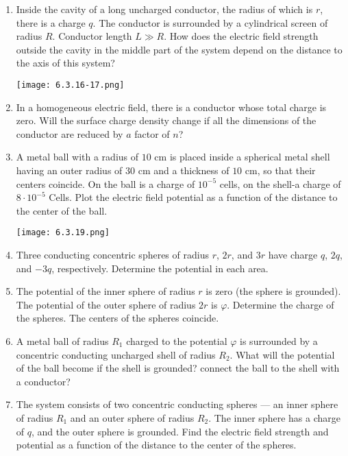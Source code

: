 \documentclass{article}
\begin{document}
\begin{enumerate}[label=6.3.\arabic*]
\item Inside the cavity of a long uncharged conductor, the radius of which is $r$, there is a charge $q$. The conductor is surrounded by a cylindrical screen of radius $R$. Conductor length $L \gg R$. How does the electric field strength outside the cavity in the middle part of the system depend on the distance to the axis of this system?

\begin{center}
    \texttt{[image: 6.3.16-17.png]}
\end{center}

\item In a homogeneous electric field, there is a conductor whose total charge is zero. Will the surface charge density change if all the dimensions of the conductor are reduced by $a$ factor of $n$?

\item A metal ball with a radius of $10$ cm is placed inside a spherical metal shell having an outer radius of $30$ cm and a thickness of $10$ cm, so that their centers coincide. On the ball is a charge of $10^{-5}$ cells, on the shell-a charge of $8 \cdot 10^{-5}$ Cells. Plot the electric field potential as a function of the distance to the center of the ball.

\begin{center}
    \texttt{[image: 6.3.19.png]}
\end{center}

\item Three conducting concentric spheres of radius $r$, $2r$, and $3r$ have charge $q$, $2q$, and $-3q$, respectively. Determine the potential in each area.

\item The potential of the inner sphere of radius $r$ is zero (the sphere is grounded). The potential of the outer sphere of radius $2r$ is $\varphi$. Determine the charge of the spheres. The centers of the spheres coincide.

\item A metal ball of radius $R_1$ charged to the potential $\varphi$ is surrounded by a concentric conducting uncharged shell of radius $R_2$. What will the potential of the ball become if the shell is grounded? connect the ball to the shell with a conductor?

\item The system consists of two concentric conducting spheres — an inner sphere of radius $R_1$ and an outer sphere of radius $R_2$. The inner sphere has a charge of $q$, and the outer sphere is grounded. Find the electric field strength and potential as a function of the distance to the center of the spheres.


\end{enumerate}
\end{document}
